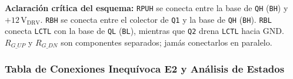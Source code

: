 \documentclass[10pt, a4paper, landscape]{article}
\begin{document}
\noindent
\textbf{Aclaración crítica del esquema:} \texttt{RPUH} se conecta entre la base de \texttt{QH} (\texttt{BH}) y $+12\,\text{V}_{\text{DRV}}$. \texttt{RBH} se conecta entre el colector de \texttt{Q1} y la base de \texttt{QH} (\texttt{BH}). \texttt{RBL} conecta \texttt{LCTL} con la base de \texttt{QL} (\texttt{BL}), mientras que \texttt{Q2} drena \texttt{LCTL} hacia GND. $R_{G\_UP}$ y $R_{G\_DN}$ son componentes separados; jamás conectarlos en paralelo.

\newpage
\subsubsection*{Tabla de Conexiones Inequívoca E2 y Análisis de Estados}

\par\vspace{0.08cm}\noindent
\renewcommand{\arraystretch}{1.15}
\end{document}
